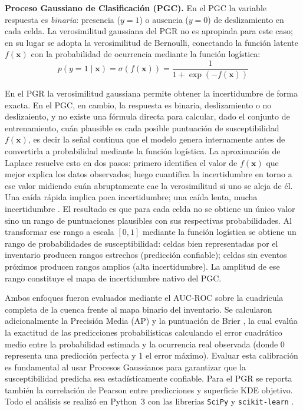 \documentclass[12pt, a4paper]{article}
\begin{document}
\textbf{Proceso Gaussiano de Clasificación (PGC).} En el PGC la variable respuesta es
\textit{binaria}: presencia ($y=1$) o ausencia ($y=0$) de deslizamiento en cada celda. La verosimilitud
gaussiana del PGR no es apropiada para este caso; en su lugar se adopta la verosimilitud de Bernoulli,
conectando la función latente $f(\mathbf{x})$ con la probabilidad de ocurrencia mediante la función logística:
\begin{equation}
    p(y=1\mid\mathbf{x}) = \sigma\!\left(f(\mathbf{x})\right) = \frac{1}{1 + \exp\!\left(-f(\mathbf{x})\right)}
    \label{eq:gpc}
\end{equation}

En el PGR la verosimilitud gaussiana permite obtener la incertidumbre de forma exacta.
En el PGC, en cambio, la respuesta es binaria, deslizamiento o no deslizaiento, y no existe
una fórmula directa para calcular, dado el conjunto de entrenamiento, cuán plausible es
cada posible puntuación de susceptibilidad $f(\mathbf{x})$, es decir la señal continua que el modelo
genera internamente antes de convertirla a probabilidad mediante la función logística.
La aproximación de Laplace resuelve esto en dos pasos: primero identifica el valor de
$f(\mathbf{x})$ que mejor explica los datos observados; luego cuantifica la incertidumbre
en torno a ese valor midiendo cuán abruptamente cae la verosimilitud si uno se aleja de
él. Una caída rápida implica poca incertidumbre; una caída lenta, mucha incertidumbre \citep{Rasmussen2006}.
El resultado es que para cada celda no se obtiene un único valor sino un rango de
puntuaciones plausibles con sus respectivas probabilidades. Al transformar ese rango a
escala $[0,1]$ mediante la función logística se obtiene un rango de probabilidades
de susceptibilidad: celdas bien representadas por el inventario producen rangos estrechos
(predicción confiable); celdas sin eventos próximos producen rangos amplios (alta
incertidumbre). La amplitud de ese rango constituye el mapa de incertidumbre nativo del PGC.

Ambos enfoques fueron evaluados mediante el AUC-ROC \citep{Fawcett2006} sobre la cuadrícula completa de la cuenca frente al mapa
binario del inventario. Se calcularon adicionalmente la Precisión Media (AP) y la puntuación de Brier \citep{Brier1950}, 
la cual evalúa la exactitud de las predicciones probabilísticas calculando el error cuadrático medio entre la probabilidad estimada 
y la ocurrencia real observada (donde 0 representa una predicción perfecta y 1 el error máximo). Evaluar esta calibración es fundamental 
al usar Procesos Gaussianos para garantizar que la susceptibilidad predicha sea estadísticamente confiable. Para el
PGR se reporta también la correlación de Pearson entre predicciones y superficie KDE objetivo. Todo el análisis se realizó en 
Python~3 con las librerias \texttt{SciPy} y \texttt{scikit-learn} \citep{Pedregosa2011}.
\end{document}

